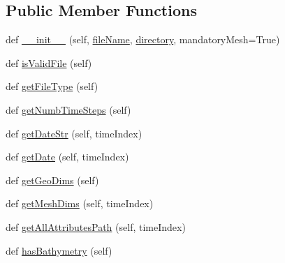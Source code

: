 \subsection*{Public Member Functions}
\begin{DoxyCompactItemize}
\item 
def \mbox{\hyperlink{class_m_h_d_f5__reader_1_1_m_h_d_f5_reader_a11826c8a3513ad304efedf7a63ceb992}{\+\_\+\+\_\+init\+\_\+\+\_\+}} (self, \mbox{\hyperlink{class_m_h_d_f5__reader_1_1_m_h_d_f5_reader_acfb0f212ab6190056926277fbc215ff4}{file\+Name}}, \mbox{\hyperlink{class_m_h_d_f5__reader_1_1_m_h_d_f5_reader_abb791fb16427504bfe7dfa73204747e9}{directory}}, mandatory\+Mesh=True)
\item 
def \mbox{\hyperlink{class_m_h_d_f5__reader_1_1_m_h_d_f5_reader_a6f95078ac94bea3283223688091854d5}{is\+Valid\+File}} (self)
\item 
def \mbox{\hyperlink{class_m_h_d_f5__reader_1_1_m_h_d_f5_reader_af878d42810452ebceffe648bd04970d1}{get\+File\+Type}} (self)
\item 
def \mbox{\hyperlink{class_m_h_d_f5__reader_1_1_m_h_d_f5_reader_a5ba881e026e00f66ea31d212dd0be87b}{get\+Numb\+Time\+Steps}} (self)
\item 
def \mbox{\hyperlink{class_m_h_d_f5__reader_1_1_m_h_d_f5_reader_a81ca43bbc8a077b4daf07e07bba3e31d}{get\+Date\+Str}} (self, time\+Index)
\item 
def \mbox{\hyperlink{class_m_h_d_f5__reader_1_1_m_h_d_f5_reader_a0c16ad2e43bb3171cfec1b227e042218}{get\+Date}} (self, time\+Index)
\item 
def \mbox{\hyperlink{class_m_h_d_f5__reader_1_1_m_h_d_f5_reader_aa433954c98bbb5384bbd25e523ca1925}{get\+Geo\+Dims}} (self)
\item 
def \mbox{\hyperlink{class_m_h_d_f5__reader_1_1_m_h_d_f5_reader_aa80431c3897dbff8479ebcdde1676e26}{get\+Mesh\+Dims}} (self, time\+Index)
\item 
def \mbox{\hyperlink{class_m_h_d_f5__reader_1_1_m_h_d_f5_reader_ac1ab22571dbffbce200aec34fd658dc5}{get\+All\+Attributes\+Path}} (self, time\+Index)
\item 
def \mbox{\hyperlink{class_m_h_d_f5__reader_1_1_m_h_d_f5_reader_a7e1fc985528e18756f46dd9d31bc6530}{has\+Bathymetry}} (self)
\end{DoxyCompactItemize}
